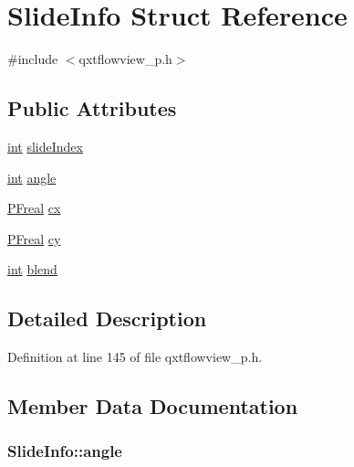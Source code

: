 \hypertarget{struct_slide_info}{\section{Slide\-Info Struct Reference}
\label{struct_slide_info}
}


{\ttfamily \#include $<$qxtflowview\-\_\-p.\-h$>$}

\subsection*{Public Attributes}
\begin{DoxyCompactItemize}
\item 
\hyperlink{ioapi_8h_a787fa3cf048117ba7123753c1e74fcd6}{int} \hyperlink{struct_slide_info_a75666008da2e60cc35dd1a1e56e4d1c6}{slide\-Index}
\item 
\hyperlink{ioapi_8h_a787fa3cf048117ba7123753c1e74fcd6}{int} \hyperlink{struct_slide_info_aa0134f97d9169b680ae74c142772a209}{angle}
\item 
\hyperlink{qxtflowview__p_8h_af0b7719267685844f4989a9279e712b9}{P\-Freal} \hyperlink{struct_slide_info_a858a9387c92e84eabdde1c91aac8e1c6}{cx}
\item 
\hyperlink{qxtflowview__p_8h_af0b7719267685844f4989a9279e712b9}{P\-Freal} \hyperlink{struct_slide_info_aebd2ca3d204940e40018c778a842b133}{cy}
\item 
\hyperlink{ioapi_8h_a787fa3cf048117ba7123753c1e74fcd6}{int} \hyperlink{struct_slide_info_a8df07b9d2429a27b3f1a7b341df3bf7b}{blend}
\end{DoxyCompactItemize}


\subsection{Detailed Description}


Definition at line 145 of file qxtflowview\-\_\-p.\-h.



\subsection{Member Data Documentation}
\hypertarget{struct_slide_info_aa0134f97d9169b680ae74c142772a209}{
\subsubsection[{angle}]{ Slide\-Info\-::angle}}\label{struct_slide_info_aa0134f97d9169b680ae74c142772a209}


